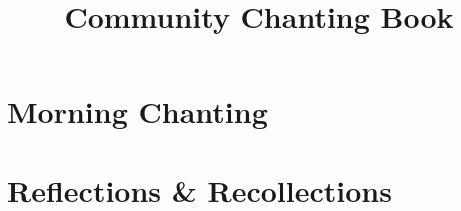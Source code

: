\documentclass[final]{chantingbook}
\title{Community Chanting Book}
\begin{document}
%
%

\mainmatter


\part{Morning Chanting}



%
%

\cleartorecto
\part{Reflections \& Recollections}

\setlength{\parskip}{10pt}



%
%
%
\end{document}
